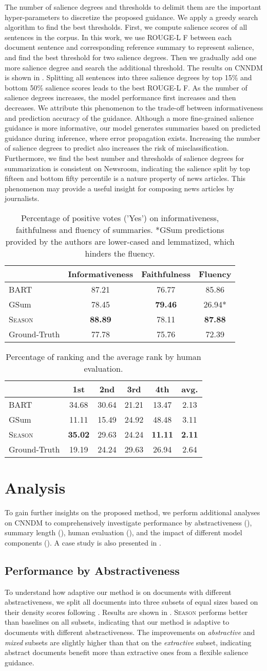 \documentclass[11pt]{article}
\newcommand{\MODEL}{\mbox{\textsc{Season}}\xspace}
\newcommand{\TABLEHUMANEVAL}{
    \begin{table}[!t]
        \centering
        \small
        \setlength{\tabcolsep}{3.5pt}
        \begin{tabular}{lccc}\toprule
             &\textbf{Informativeness} &\textbf{Faithfulness} &\textbf{Fluency} \\\midrule
            BART   & 87.21 & 76.77 & 85.86 \\
            GSum   & 78.45 & \textbf{79.46} & 26.94*\\
            \MODEL & \textbf{88.89} & 78.11 & \textbf{87.88} \\
            Ground-Truth   & 77.78 & 75.76 & 72.39	\\\bottomrule
        \end{tabular}
        \caption{\small Percentage of positive votes ('Yes') on informativeness, faithfulness and fluency of summaries. *GSum predictions provided by the authors are lower-cased and lemmatized, which hinders the fluency. }
        \label{tab:human_evaluation_questions}
        \vspace{-0.5em}
    \end{table}
}
\newcommand{\TABLEHUMANRANK}{
    \begin{table}[!t]
        \centering
        \small
        \begin{tabular}{lccccc}\toprule
             &\textbf{1st} &\textbf{2nd} &\textbf{3rd} & \textbf{4th} & \textbf{avg.}\\\midrule
            BART   & 34.68 & 30.64 & 21.21 & 13.47 & 2.13 \\
            GSum   & 11.11 & 15.49 & 24.92 & 48.48 & 3.11 \\
            \MODEL & \textbf{35.02} & 29.63 & 24.24 & \textbf{11.11} & \textbf{2.11} \\
            Ground-Truth   & 19.19 & 24.24 & 29.63 & 26.94 & 2.64	\\\bottomrule
        \end{tabular}
        \caption{\small Percentage of ranking and the average rank by human evaluation.}
        \label{tab:human_evaluation_ranking}
        \vspace{-1em}
    \end{table}
}
\begin{document}
The number of salience degrees and thresholds to delimit them are the important hyper-parameters to discretize the proposed guidance.
We apply a greedy search algorithm to find the best thresholds.
First, we compute salience scores of all sentences in the corpus. In this work, we use ROUGE-L F between each document sentence and corresponding reference summary to represent salience, and find the best threshold for two salience degrees.
Then we gradually add one more salience degree and search the additional threshold.
The results on CNNDM is shown in .
Splitting all sentences into three salience degrees by top 15\% and bottom 50\% salience scores leads to the best ROUGE-L F.
As the number of salience degrees  increases, the model performance first increases and then decreases. We attribute this phenomenon to the trade-off between informativeness and prediction accuracy of the guidance. Although a more fine-grained salience guidance is more informative, our model generates summaries based on predicted guidance during inference, where error propagation exists. Increasing the number of salience degrees to predict also increases the risk of misclassification.
Furthermore, we find the best number and thresholds of salience degrees for summarization is consistent on Newsroom, indicating the salience split by top fifteen and bottom fifty percentile is a nature property of news articles.
This phenomenon may provide a useful insight for composing news articles by journalists.

\TABLEHUMANEVAL
\TABLEHUMANRANK



\section{Analysis}
To gain further insights on the proposed method, we perform additional analyses on CNNDM to comprehensively investigate performance by abstractiveness (), 
summary length (), human evaluation (), and the impact of different model components ().  A case study is also presented in . 



\subsection{Performance by Abstractiveness}
\label{sec:abstractiveness}
To understand how adaptive our method is on documents with different abstractiveness, we split all documents into three subsets of equal sizes based on their density scores following \citet{grusky2018newsroom}. Results are shown in . \MODEL performs better than baselines on all subsets, indicating that our method is adaptive to documents with different abstractiveness. The improvements on \textit{abstractive} and \textit{mixed} subsets are slightly higher than that on the \textit{extractive} subset, indicating abstract documents benefit more than extractive ones from a flexible salience guidance.
\end{document}
